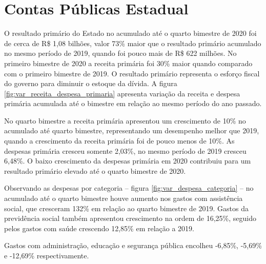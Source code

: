 
\hypertarget{contas-puxfablicas-estadual}{%
\chapter{Contas Públicas Estadual}\label{contas-puxfablicas-estadual}}

O resultado primário do Estado no acumulado até o quarto bimestre de
2020 foi de cerca de R\$ 1,08 bilhões, valor 73\% maior que o resultado
primário acumulado no mesmo período de 2019, quando foi pouco mais de
R\$ 622 milhões. No primeiro bimestre de 2020 a receita primária foi
30\% maior quando comparado com o primeiro bimestre de 2019. O resultado
primário representa o esforço fiscal do governo para diminuir o estoque
da dívida. A figura \ref{fig:var_receita_despesa_primaria} apresenta
variação da receita e despesa primária acumulada até o bimestre em
relação ao mesmo período do ano passado.

No quarto bimestre a receita primária apresentou um crescimento de 10\%
no acumulado até quarto bimestre, representando um desempenho melhor que
2019, quando a crescimento da receita primária foi de pouco menos de
10\%. As despesas primária cresceu somente 2,03\%, no mesmo período de
2019 cresceu 6,48\%. O baixo crescimento da despesas primária em 2020
contribuiu para um resultado primário elevado até o quarto bimestre de
2020.

Observando as despesas por categoria -- figura \ref{fig:var_despesa_categoria} --
no acumulado até o quarto bimestre houve aumento nos gastos com assistência
social, que cresceram 132\% em
relação ao quarto bimestre de 2019. Gastos da previdência social também
apresentou crescimento na ordem de 16,25\%, seguido pelos gastos com
saúde crescendo 12,85\% em relação a 2019.

Gastos com administração, educação e segurança pública encolheu -6,85\%,
-5,69\% e -12,69\% respectivamente.


